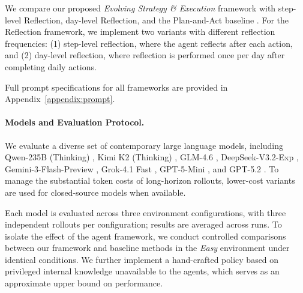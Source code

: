 We compare our proposed \textit{Evolving Strategy \& Execution} framework with step-level Reflection, day-level Reflection, and the Plan-and-Act baseline \citep{reflection, 2025planandact}. For the Reflection framework, we implement two variants with different reflection frequencies: (1) step-level reflection, where the agent reflects after each action, and (2) day-level reflection, where reflection is performed once per day after completing daily actions.

Full prompt specifications for all frameworks are provided in Appendix~\ref{appendix:prompt}.

\paragraph{Models and Evaluation Protocol.}

We evaluate a diverse set of contemporary large language models, including Qwen-235B (Thinking) \citep{qwen3technicalreport}, Kimi K2 (Thinking) \citep{kimiteam2025kimik2openagentic}, GLM-4.6 \citep{glm4_5}, DeepSeek-V3.2-Exp \citep{deepseekai2025deepseekv32pushingfrontieropen}, Gemini-3-Flash-Preview \citep{gemini3flashpreview}, Grok-4.1 Fast \citep{xai_grok41fast}, GPT-5-Mini \citep{openai_gpt5mini2025}, and GPT-5.2 \citep{openai_gpt52}. To manage the substantial token costs of long-horizon rollouts, lower-cost variants are used for closed-source models when available.

Each model is evaluated across three environment configurations, with three independent rollouts per configuration; results are averaged across runs. To isolate the effect of the agent framework, we conduct controlled comparisons between our framework and baseline methods in the \textit{Easy} environment under identical conditions. We further implement a hand-crafted policy based on privileged internal knowledge unavailable to the agents, which serves as an approximate upper bound on performance.